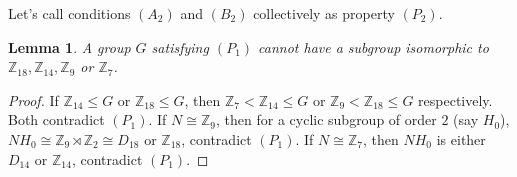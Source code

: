 \documentclass[a4paper,11pt]{amsart}
\numberwithin{equation}{section}
\numberwithin{equation}{subsection}
\newtheorem{lemma}[theorem]{Lemma}
\begin{document}
 Let's call conditions $(A_2)$ and $(B_2)$ collectively as property $(P_2)$.


 \begin{lemma}\label{lemma4}
    A group $G$ satisfying $(P_1)$ cannot have a subgroup isomorphic to $\mathbb{Z}_{18},\mathbb{Z}_{14},\mathbb{Z}_{9}$ or $\mathbb{Z}_{7}$.
\end{lemma}
\begin{proof}
     If $\mathbb{Z}_{14} \leq G$ or $\mathbb{Z}_{18} \leq G$, then $\mathbb{Z}_7<\mathbb{Z}_{14}\leq G$ or $\mathbb{Z}_9<\mathbb{Z}_{18}\leq G$ respectively. Both  contradict $(P_1)$. If $N\cong  \mathbb{Z}_{9}$, then for  a cyclic subgroup of order $2$ (say $H_0$), $NH_{0}\cong \mathbb{Z}_{9}\rtimes \mathbb{Z}_{2}\cong D_{18}$ or $\mathbb{Z}_{18}$, contradict $(P_1)$. If $N \cong \mathbb{Z}_{7}$, then $NH_{0}$ is either $D_{14}$ or $\mathbb{Z}_{14}$,  contradict $(P_{1})$.
     
    \end{proof}
    
\end{document}
